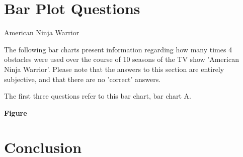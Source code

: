 \section{\textbf{Bar Plot Questions}}

American Ninja Warrior\newline

The following bar charts present information regarding how many times 4 obstacles were used over the course of 10 seasons of the TV show 'American Ninja Warrior'. Please note that the answers to this section are entirely subjective, and that there are no 'correct' answers.\newline


The first three questions refer to this bar chart, bar chart A.

\textbf{Figure}












\section{Conclusion}
